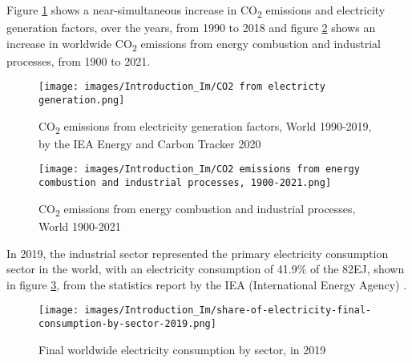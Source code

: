 Figure \ref{fig: CO2ElectricityConsumptionWorld} shows a near-simultaneous increase in CO\textsubscript{2} emissions and electricity generation factors, over the years, from 1990 to 2018 and figure \ref{fig: CO2EnergyCombustionIndustrial} shows an increase in worldwide CO\textsubscript{2} emissions from energy combustion and industrial processes, from 1900 to 2021.


\begin{figure}[H]
    \centering
    \texttt{[image: images/Introduction\_Im/CO2 from electricty generation.png]}
    \caption{CO\textsubscript{2} emissions from electricity generation factors, World 1990-2019, by the IEA Energy and Carbon Tracker 2020 \cite{IEA_EnergyTracker} }
    \label{fig: CO2ElectricityConsumptionWorld}
\end{figure}



\begin{figure}[H]
    \centering
    \texttt{[image: images/Introduction\_Im/CO2 emissions from energy combustion and industrial processes, 1900-2021.png]}
    \caption{CO\textsubscript{2} emissions from energy combustion and industrial processes, World 1900-2021 \cite{IEA_GlobalEnergyReview_2021} }
    \label{fig: CO2EnergyCombustionIndustrial}
\end{figure}



In 2019, the industrial sector represented the primary electricity consumption sector in the world, with an electricity consumption of 41.9\% of the 82EJ, shown in figure \ref{fig: FinalEnergySectorWorld}, from the statistics report by the IEA (International Energy Agency) \cite{IEA_StatisticsReport_2021}.

\begin{figure}[H]
    \centering
    \texttt{[image: images/Introduction\_Im/share-of-electricity-final-consumption-by-sector-2019.png]}
    \caption{Final worldwide electricity consumption by sector, in 2019 \cite{IEA_StatisticsReport_2021} }
    \label{fig: FinalEnergySectorWorld}
\end{figure}


